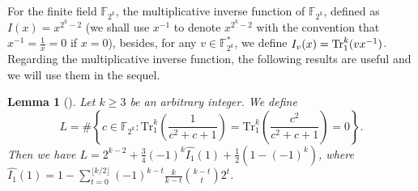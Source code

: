 \documentclass{article}
\newcommand{\F}{\mathbb{F}}
\newcommand{\0}{\textbf{0}}
\newcommand{\1}{\textbf{1}}
\theoremstyle{plain}
\newtheorem{lemma}{Lemma}
\begin{document}
    For the finite field $\F_{2^k}$, the multiplicative inverse function of $\F_{2^k}$, defined as $I(x)=x^{2^k-2}$ (we shall use $x^{-1}$ to denote $x^{2^k-2}$ with the convention that $x^{-1}=\frac{1}{x}=0$ if $x=0$), besides, for any $v\in\F_{2^k}^*$, we define $I_v(x)=\Tr_1^k(vx^{-1})$.
    Regarding the multiplicative inverse function, the following results are useful and we will use them in the sequel.

    \begin{lemma}[\cite{TangMM2022inversefunction}]\label{L:SumInv00}
        Let $k\geq 3$ be an arbitrary integer.
        We define
        $$L=\#\left\{c\in\F_{2^k}  :  \mathrm{Tr}_1^k\left(\frac{1}{c^2+c+1}\right)=\mathrm{Tr}_1^k\left(\frac{c^2}{c^2+c+1}\right)=0\right\}.$$
        Then we have $L=2^{k-2}+\frac{3}{4}(-1)^k\widehat{I_1}(1)+\frac{1}{2}\left(1-(-1)^k\right)$, where $\widehat{I_1}(1)=1-\sum_{t=0}^{\lfloor k/2\rfloor}(-1)^{k-t}\frac{k}{k-t}{{k-t}\choose {t}}2^t$.
    \end{lemma}

\end{document}

